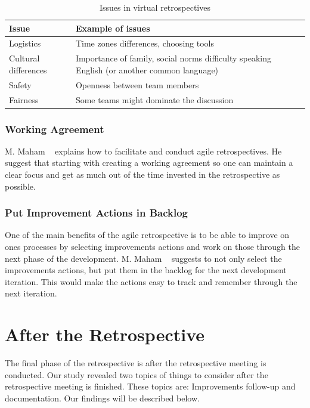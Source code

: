 \documentclass[12pt]{article}
\begin{document}
\begin{table}[!h]
	\centering
	\captionsetup{justification=centering}
	\caption{Issues in virtual retrospectives}
	\label{table:issues_virtual}
	\begin{tabular}{| l | p{}|}
	\hline
	Issue & Example of issues \\ \hline
	Logistics & Time zones differences, choosing tools \\
	Cultural differences & Importance of family, social norms difficulty speaking English (or another common language) \\
	Safety & Openness between team members \\
	Fairness & Some teams might dominate the discussion \\
	\hline
	\end{tabular}
\end{table}	





\subsubsection{Working Agreement}
M. Maham ~\cite{Maham2008} explains how to facilitate and conduct agile retrospectives. He suggest that starting with creating a working agreement so one can maintain a clear focus and get as much out of the time invested in the retrospective as possible. 

\subsubsection{Put Improvement Actions in Backlog}
One of the main benefits of the agile retrospective is to be able to improve on ones processes by selecting improvements actions and work on those through the next phase of the development. M. Maham ~\cite{Maham2008} suggests to not only select the improvements actions, but put them in the backlog for the next development iteration. This would make the actions easy to track and remember through the next iteration. 

\section{After the Retrospective}
The final phase of the retrospective is after the retrospective meeting is conducted. Our study revealed two topics of things to consider after the retrospective meeting is finished. These topics are: Improvements follow-up and documentation. Our findings will be described below.
\end{document}
